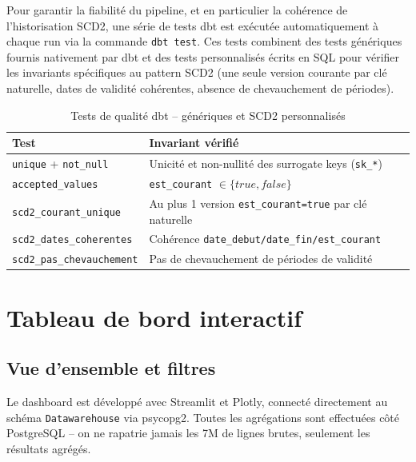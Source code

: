 \documentclass[12pt,a4paper]{article}
\let\oldsection\section
\renewcommand{\section}{\clearpage\oldsection}
\newcommand{\sql}[1]{\texttt{\small #1}}
\begin{document}
Pour garantir la fiabilité du pipeline, et en particulier la cohérence de
l'historisation SCD2, une série de tests dbt est exécutée automatiquement à
chaque run via la commande \texttt{dbt test}. Ces tests combinent des tests
génériques fournis nativement par dbt et des tests personnalisés écrits en
SQL pour vérifier les invariants spécifiques au pattern SCD2 (une seule
version courante par clé naturelle, dates de validité cohérentes, absence de
chevauchement de périodes).

\begin{table}[H]
  \centering
  \begin{tabularx}{\linewidth}{lX}
    \toprule
    \textbf{Test} & \textbf{Invariant vérifié} \\
    \midrule
    \texttt{unique} + \texttt{not\_null} & Unicité et non-nullité des surrogate keys (\sql{sk\_*}) \\
    \texttt{accepted\_values}            & \sql{est\_courant} $\in \{true, false\}$ \\
    \texttt{scd2\_courant\_unique}       & Au plus 1 version \sql{est\_courant=true} par clé naturelle \\
    \texttt{scd2\_dates\_coherentes}     & Cohérence \sql{date\_debut/date\_fin/est\_courant} \\
    \texttt{scd2\_pas\_chevauchement}    & Pas de chevauchement de périodes de validité \\
    \bottomrule
  \end{tabularx}
  \caption{Tests de qualité dbt -- génériques et SCD2 personnalisés}
\end{table}

\section{Tableau de bord interactif}

\subsection{Vue d'ensemble et filtres}

Le dashboard est développé avec Streamlit et Plotly,
connecté directement au schéma \texttt{Datawarehouse} via psycopg2.
Toutes les agrégations sont effectuées côté PostgreSQL -- on ne
rapatrie jamais les 7M de lignes brutes, seulement les résultats agrégés.
\end{document}
